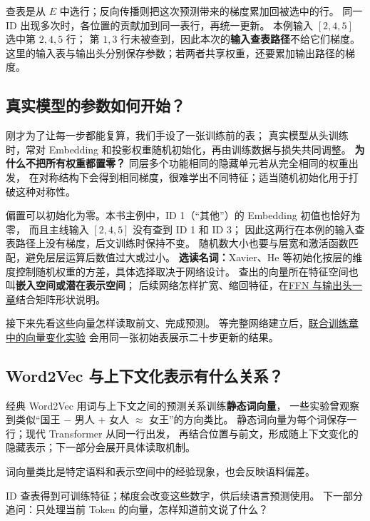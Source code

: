 查表是从 $E$ 中选行；反向传播则把这次预测带来的梯度累加回被选中的行。
同一 ID 出现多次时，各位置的贡献加到同一表行，再统一更新。
本例输入 $[2,4,5]$ 选中第 $2,4,5$ 行；
第 $1,3$ 行未被查到，因此本次的\textbf{输入查表路径}不给它们梯度。
这里的输入表与输出头分别保存参数；若两者共享权重，还要累加输出路径的梯度。

\subsection{真实模型的参数如何开始？}
\label{concept:embedding-initialization}

刚才为了让每一步都能复算，我们手设了一张训练前的表；
真实模型从头训练时，常对 Embedding 和投影权重随机初始化，再由训练数据与损失共同调整。
\textbf{为什么不把所有权重都置零？}
同层多个功能相同的隐藏单元若从完全相同的权重出发，
在对称结构下会得到相同梯度，很难学出不同特征；适当随机初始化用于打破这种对称性。

偏置可以初始化为零。本书主例中，ID 1（“其他”）的 Embedding 初值也恰好为零，
而且主线输入 $[2,4,5]$ 没有查到 ID 1 和 ID 3；
因此这两行在本例的输入查表路径上没有梯度，后文训练时保持不变。
随机数大小也要与层宽和激活函数匹配，避免层层运算后数值过大或过小。
\textbf{选读名词：}Xavier、He 等初始化按层的维度控制随机权重的方差，具体选择取决于网络设计。
查出的向量所在特征空间也叫\textbf{嵌入空间或潜在表示空间}；
后续网络怎样扩宽、缩回特征，在\hyperref[intro:ffn-output-head]{FFN 与输出头一章}结合矩阵形状说明。

接下来先看这些向量怎样读取前文、完成预测。
等完整网络建立后，\hyperref[sec:embedding-training-snapshot]{联合训练章中的向量变化实验}
会用同一张初始表展示二十步更新的结果。

\subsection{Word2Vec 与上下文化表示有什么关系？}

经典 Word2Vec 用词与上下文之间的预测关系训练\textbf{静态词向量}，
一些实验曾观察到类似“国王 $-$ 男人 $+$ 女人 $\approx$ 女王”的方向类比。
静态词向量为每个词保存一行；现代 Transformer 从同一行出发，
再结合位置与前文，形成随上下文变化的隐藏表示；下一部分会展开具体读取机制。

词向量类比是特定语料和表示空间中的经验现象，也会反映语料偏差。



\par\smallskip
ID 查表得到可训练特征；梯度会改变这些数字，供后续语言预测使用。
下一部分追问：只处理当前 Token 的向量，怎样知道前文说了什么？\label{route:embedding-end}
